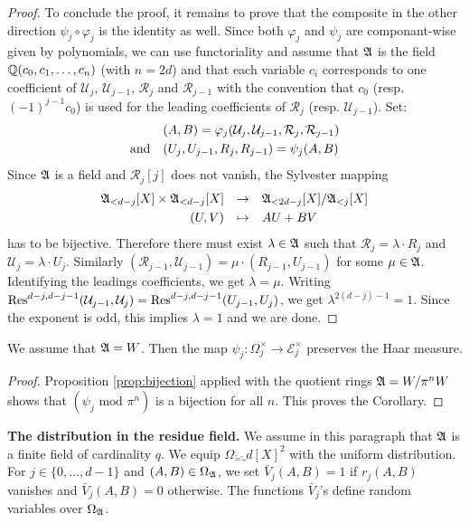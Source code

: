 \documentclass{article}
\begin{document}
\begin{proof}
To conclude the proof, it remains to prove that the composite in 
the other direction $\psi_j \circ \varphi_j$ is the identity as well. 
Since both $\varphi_j$ and $\psi_j$ are componant-wise given by 
polynomials, we can use functoriality and assume that $\mathfrak A$ is 
the field $\mathbb Q(c_0, c_1, \ldots, c_n)$ (with $n = 2d$) and that 
each variable $c_i$ corresponds to one coefficient of $\mathcal U_j$, 
$\mathcal U_{j-1}$, $\mathcal R_j$ and $\mathcal R_{j-1}$ with the
convention that $c_0$ (resp. $(-1)^{j-1} c_0$) is used for the leading
coefficients of $\mathcal R_j$ (resp. $\mathcal U_{j-1}$). Set:
$$\begin{array}{ll}
& (A,B) = \varphi_j(\mathcal U_j, \mathcal U_{j-1}, 
\mathcal R_j, \mathcal R_{j-1}) \smallskip \\
\text{and} & (U_j, U_{j-1}, R_j, R_{j-1}) = \psi_j(A,B)
\end{array}$$
Since $\mathfrak A$ is a field and $\mathcal R_j[j]$ does not vanish, the 
Sylvester mapping
$$\begin{array}{rcl}
\ring_{<d-j}[X] \times \ring_{<d-j}[X] & \to & 
\ring_{<2d-j}[X]/\ring_{<j}[X] \smallskip \\
(U,V) & \mapsto & AU + BV
\end{array}$$
has to be bijective. Therefore there must exist $\lambda \in \mathfrak A$ 
such that $\mathcal R_j = \lambda \cdot R_j$ and $\mathcal U_j = \lambda 
\cdot U_j$. Similarly $(\mathcal R_{j-1}, \mathcal U_{j-1}) = \mu \cdot
(R_{j-1}, U_{j-1})$ for some $\mu \in \mathfrak A$. Identifying the leadings 
coefficients, we get $\lambda = \mu$. Writing
$\text{\rm Res}^{d-j,d-j-1}(\mathcal U_{j-1}, \mathcal U_j) = 
\text{\rm Res}^{d-j,d-j-1}(U_{j-1}, U_j)$,
we get $\lambda^{2(d-j)-1} = 1$. Since the exponent is odd, this implies 
$\lambda = 1$ and we are done.
\end{proof}

\begin{cor}
\label{cor:bijection}
We assume that $\mathfrak A = W$. Then the map $\psi_j : \Omega_j^\times
\to \mathcal E_j^\times$ preserves the Haar measure.
\end{cor}

\begin{proof}
Proposition \ref{prop:bijection} applied with the quotient rings $\mathfrak A 
= W/\pi^nW$ shows that $(\psi_j \text{ mod } \pi^n)$ is a bijection 
for all $n$. This proves the Corollary.
\end{proof}

\noindent 
\textbf{The distribution in the residue field.}
We assume in this paragraph that $\mathfrak A$ is a finite field of 
cardinality $q$. We equip $\Omega_\ring = \ring_d[X]^2$ with the uniform 
distribution. For $j \in \{0, \ldots, d-1\}$ and $(A,B) \in \Omega_\mathfrak A$,
we set $\bar V_j(A,B) = 1$ if $r_j(A,B)$ vanishes and $\bar V_j(A,B) = 0$
otherwise. The functions $\bar V_j$'s define random variables over 
$\Omega_\mathfrak A$.
\end{document}
